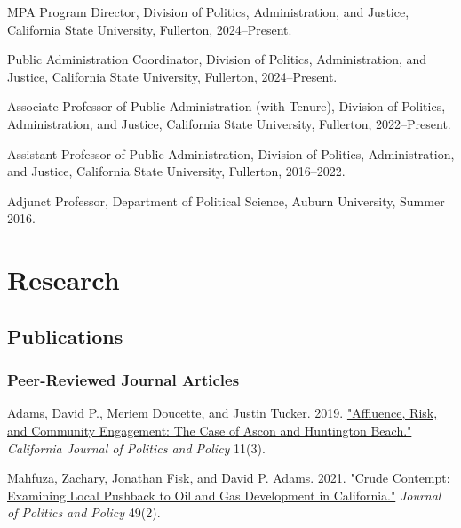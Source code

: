 \documentclass[12pt,letterpaper]{article}
\renewenvironment{itemize}{
  \begin{list}{}{
    \setlength{\leftmargin}{1.5em}
    \setlength{\itemsep}{0.25em}
    \setlength{\parskip}{0pt}
    \setlength{\parsep}{0.25em}
  }
}{
  \end{list}
}
\begin{document}
  \begin{itemize}\leftmargin=2pt\itemindent=-15pt\leftmargin=2pt\itemindent=-15pt
      \item MPA Program Director, Division of Politics, Administration, and Justice, California State University, Fullerton, 2024--Present. \vspace{0.2cm}
      \item Public Administration Coordinator, Division of Politics, Administration, and Justice, California State University, Fullerton, 2024--Present. \vspace{0.2cm}
      \item Associate Professor of Public Administration (with Tenure), Division of Politics, Administration, and Justice, California State University, Fullerton, 2022--Present. \vspace{0.2cm}
      \item Assistant Professor of Public Administration, Division of Politics, Administration, and Justice, California State University, Fullerton,  2016--2022.\vspace{0.2cm}
      \item Adjunct Professor, Department of Political Science, Auburn University, Summer 2016.
  \end{itemize}

\section*{Research}

\subsection*{Publications}

\subsubsection*{Peer-Reviewed Journal Articles}

\begin{itemize}\leftmargin=2pt\itemindent=-15pt\leftmargin=2pt\itemindent=-15pt

    \item Adams, David P., Meriem Doucette, and Justin Tucker. 2019. \href{https://escholarship.org/uc/item/2mz2n6qk}{"Affluence, Risk, and Community Engagement: The Case of Ascon and Huntington Beach."} \emph{California Journal of Politics and Policy} 11(3).
    
    \item Mahfuza, Zachary, Jonathan Fisk, and David P. Adams. 2021. \href{https://doi.org/10.1111/polp.12401}{"Crude Contempt: Examining Local Pushback to Oil and Gas Development in California."} \emph{Journal of Politics and Policy} 49(2).

  \end{itemize}
\end{document}
